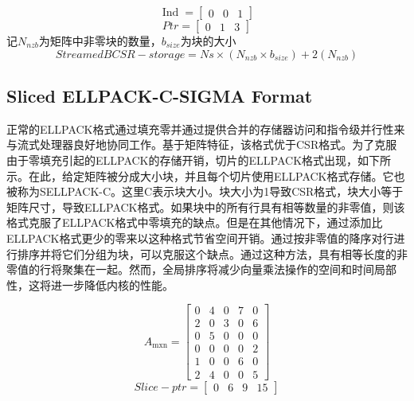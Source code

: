 \documentclass[forprint]{WHUBachelor}
\begin{document}
\begin{equation} 
\operatorname{Ind}=\left[ \begin{array}{lll}{0} & {0} & {1}\end{array}\right]
 \end{equation}
\begin{equation} 
P t r=\left[ \begin{array}{lll}{0} & {1} & {3}\end{array}\right]
 \end{equation}
记$N_{nzb}$为矩阵中非零块的数量，$b_{size}$为块的大小
\begin{equation} 
StreamedBCSR-storage=Ns \times\left(N_{nzb} \times b_{s i z e}\right)+2\left(N_{nzb}\right)
 \end{equation}
\subsection{Sliced ELLPACK-C-SIGMA Format}
正常的ELLPACK格式通过填充零并通过提供合并的存储器访问和指令级并行性来与流式处理器良好地协同工作。基于矩阵特征，该格式优于CSR格式。为了克服由于零填充引起的ELLPACK的存储开销，切片的ELLPACK格式出现\cite{Kreutzer2012Sparse}，如下所示。在此，给定矩阵被分成大小块，并且每个切片使用ELLPACK格式存储。它也被称为SELLPACK-C。这里C表示块大小。块大小为1导致CSR格式，块大小等于矩阵尺寸，导致ELLPACK格式。如果块中的所有行具有相等数量的非零值，则该格式克服了ELLPACK格式中零填充的缺点。但是在其他情况下，通过添加比ELLPACK格式更少的零来以这种格式节省空间开销。通过按非零值的降序对行进行排序并将它们分组为块，可以克服这个缺点。通过这种方法，具有相等长度的非零值的行将聚集在一起。然而，全局排序将减少向量乘法操作的空间和时间局部性，这将进一步降低内核的性能。\par
\begin{equation} 
A_{\operatorname{mxn}}=\left[ \begin{array}{ccccc}{0} & {4} & {0} & {7} & {0} \\ {2} & {0} & {3} & {0} & {6} \\ {0} & {5} & {0} & {0} & {0} \\ {0} & {0} & {0} & {0} & {2} \\ {1} & {0} & {0} & {6} & {0} \\ {2} & {4} & {0} & {0} & {5}\end{array}\right]
 \end{equation}
\begin{equation} 
Slice-ptr=\left[ \begin{array}{llll}{0} & {6} & {9} & {15}\end{array}\right]
 \end{equation}
\end{document}
